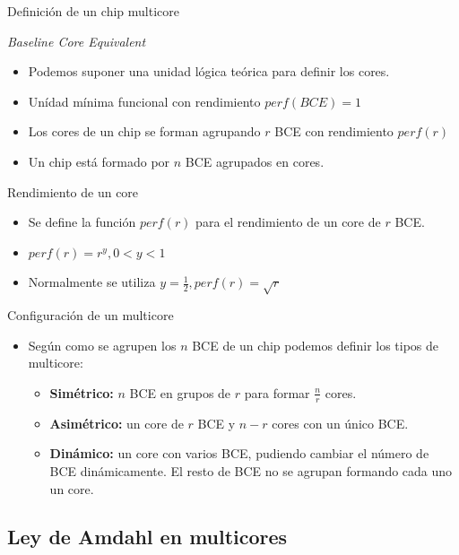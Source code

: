 \documentclass[utf8]{beamer}
\begin{document}
\begin{frame}[allowframebreaks]{Definición de un chip multicore}
    \begin{block}{\emph{Baseline Core Equivalent}}
        \begin{itemize}
        \item Podemos suponer una unidad lógica teórica para definir los cores.
        \item Unídad mínima funcional con rendimiento $perf(BCE) = 1$
        \item Los cores de un chip se forman agrupando $r$ BCE con rendimiento $perf(r)$
        \item Un chip está formado por $n$ BCE agrupados en cores.
        \end{itemize}
    \end{block}
    \begin{block}{Rendimiento de un core}
        \begin{itemize}
            \item Se define la función $perf(r)$ para el rendimiento de un core de $r$ BCE.
            \item $perf(r) = r^y, 0 < y < 1$
            \item Normalmente se utiliza $y = \frac{1}{2}, perf(r) = \sqrt{r}$
        \end{itemize}
    \end{block}
    \begin{block}{Configuración de un multicore}
        \begin{itemize}
        \item Según como se agrupen los $n$ BCE de un chip podemos definir los tipos de multicore:
            \begin{itemize}
                \item \textbf{Simétrico:} $n$ BCE en grupos de $r$ para formar $\frac{n}{r}$ cores.
                \item \textbf{Asimétrico:} un core de $r$ BCE y $n - r$ cores con un único BCE.
                \item \textbf{Dinámico:} un core con varios BCE, pudiendo cambiar el número de BCE dinámicamente. El resto de BCE no se agrupan formando cada uno un core.
            \end{itemize}
        \end{itemize}
    \end{block}
\end{frame}

\subsection*{Ley de Amdahl en multicores}
\end{document}
